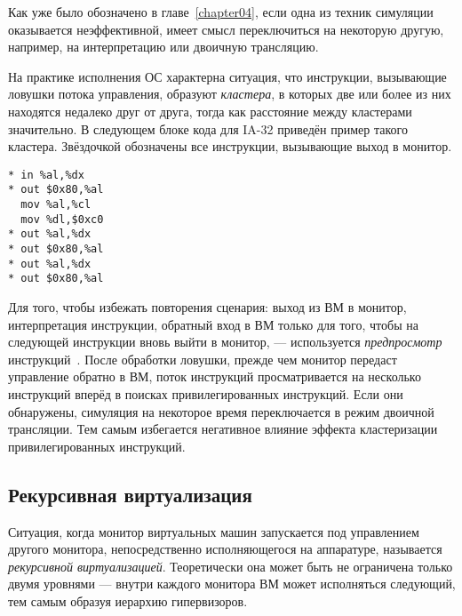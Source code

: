 Как уже было обозначено в главе~\ref{chapter04}, если одна из техник симуляции оказывается неэффективной, имеет смысл переключиться на некоторую другую, например, на интерпретацию или двоичную трансляцию.

На практике исполнения ОС характерна ситуация, что инструкции, вызывающие ловушки потока управления, образуют \emph{кластера}, в которых две или более из них находятся недалеко друг от друга, тогда как расстояние между кластерами значительно. В следующем блоке кода для IA-32 приведён пример такого кластера. Звёздочкой обозначены все инструкции, вызывающие выход в монитор.

\begin{lstlisting}
* in %al,%dx
* out $0x80,%al
  mov %al,%cl
  mov %dl,$0xc0
* out %al,%dx
* out $0x80,%al
* out %al,%dx
* out $0x80,%al
\end{lstlisting}

Для того, чтобы избежать повторения сценария: выход из ВМ в монитор, интерпретация инструкции, обратный вход в ВМ только для того, чтобы на следующей инструкции вновь выйти в монитор, --- используется \textit{предпросмотр} инструкций~\cite{Agesen:2012:STA:2342821.2342856}. После обработки ловушки, прежде чем монитор передаст управление обратно в ВМ, поток инструкций просматривается на несколько инструкций вперёд в поисках привилегированных инструкций. Если они обнаружены, симуляция на некоторое время переключается в режим двоичной трансляции. Тем самым избегается негативное влияние эффекта кластеризации привилегированных инструкций.

\subsection{Рекурсивная виртуализация}


Ситуация, когда монитор виртуальных машин запускается под управлением другого монитора, непосредственно исполняющегося на аппаратуре, называется \textit{рекурсивной виртуализацией}. Теоретически она может быть не ограничена только двумя уровнями --- внутри каждого монитора ВМ может исполняться следующий, тем самым образуя иерархию гипервизоров.

